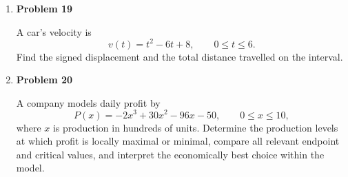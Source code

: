 \begin{enumerate}
\item \textbf{Problem 19}\par
A car's velocity is
\[
v(t)=t^2-6t+8,\qquad 0\le t\le6.
\]
Find the signed displacement and the total distance travelled on the interval.

\item \textbf{Problem 20}\par
A company models daily profit by
\[
P(x)=-2x^3+30x^2-96x-50,
\qquad 0\le x\le10,
\]
where \(x\) is production in hundreds of units. Determine the production levels at which profit is locally maximal or minimal, compare all relevant endpoint and critical values, and interpret the economically best choice within the model.
\end{enumerate}
